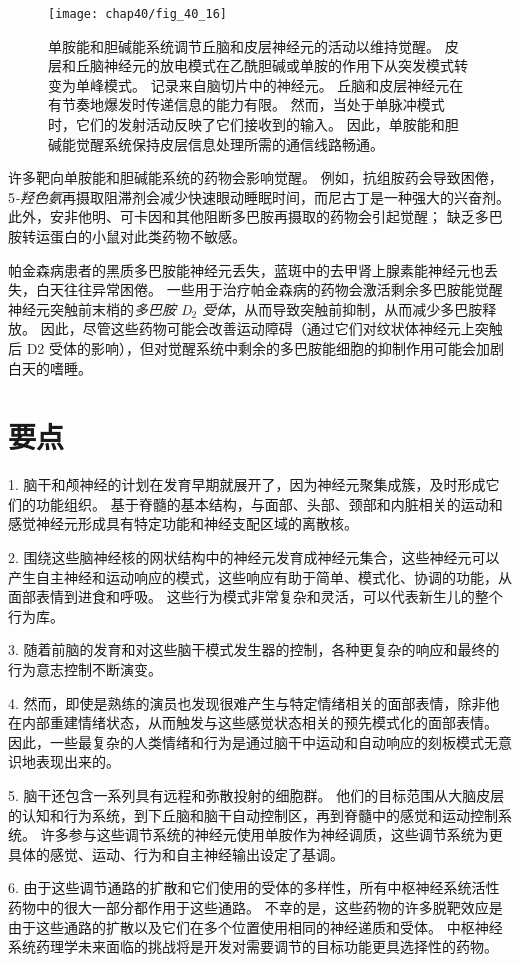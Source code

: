 \begin{figure}[htbp]
	\centering
	\texttt{[image: chap40/fig\_40\_16]}
	\caption{单胺能和胆碱能系统调节丘脑和皮层神经元的活动以维持觉醒。
		皮层和丘脑神经元的放电模式在乙酰胆碱或单胺的作用下从突发模式转变为单峰模式。
		记录来自脑切片中的神经元。
		丘脑和皮层神经元在有节奏地爆发时传递信息的能力有限。
		然而，当处于单脉冲模式时，它们的发射活动反映了它们接收到的输入。
		因此，单胺能和胆碱能觉醒系统保持皮层信息处理所需的通信线路畅通。}
	\label{fig:40_16}
\end{figure}


许多靶向单胺能和胆碱能系统的药物会影响觉醒。
例如，抗组胺药会导致困倦，5\textit{-羟色氨}再摄取阻滞剂会减少快速眼动睡眠时间，而尼古丁是一种强大的兴奋剂。
此外，安非他明、可卡因和其他阻断多巴胺再摄取的药物会引起觉醒；
缺乏多巴胺转运蛋白的小鼠对此类药物不敏感。


帕金森病患者的黑质多巴胺能神经元丢失，蓝斑中的去甲肾上腺素能神经元也丢失，白天往往异常困倦。
一些用于治疗帕金森病的药物会激活剩余多巴胺能觉醒神经元突触前末梢的\textit{多巴胺 D$_2$ 受体}，从而导致突触前抑制，从而减少多巴胺释放。
因此，尽管这些药物可能会改善运动障碍（通过它们对纹状体神经元上突触后 D2 受体的影响），但对觉醒系统中剩余的多巴胺能细胞的抑制作用可能会加剧白天的嗜睡。



\section{要点}

1. 脑干和颅神经的计划在发育早期就展开了，因为神经元聚集成簇，及时形成它们的功能组织。
基于脊髓的基本结构，与面部、头部、颈部和内脏相关的运动和感觉神经元形成具有特定功能和神经支配区域的离散核。


2. 围绕这些脑神经核的网状结构中的神经元发育成神经元集合，这些神经元可以产生自主神经和运动响应的模式，这些响应有助于简单、模式化、协调的功能，从面部表情到进食和呼吸。
这些行为模式非常复杂和灵活，可以代表新生儿的整个行为库。


3. 随着前脑的发育和对这些脑干模式发生器的控制，各种更复杂的响应和最终的行为意志控制不断演变。


4. 然而，即使是熟练的演员也发现很难产生与特定情绪相关的面部表情，除非他在内部重建情绪状态，从而触发与这些感觉状态相关的预先模式化的面部表情。
因此，一些最复杂的人类情绪和行为是通过脑干中运动和自动响应的刻板模式无意识地表现出来的。


5. 脑干还包含一系列具有远程和弥散投射的细胞群。
他们的目标范围从大脑皮层的认知和行为系统，到下丘脑和脑干自动控制区，再到脊髓中的感觉和运动控制系统。
许多参与这些调节系统的神经元使用单胺作为神经调质，这些调节系统为更具体的感觉、运动、行为和自主神经输出设定了基调。


6. 由于这些调节通路的扩散和它们使用的受体的多样性，所有中枢神经系统活性药物中的很大一部分都作用于这些通路。
不幸的是，这些药物的许多脱靶效应是由于这些通路的扩散以及它们在多个位置使用相同的神经递质和受体。
中枢神经系统药理学未来面临的挑战将是开发对需要调节的目标功能更具选择性的药物。

